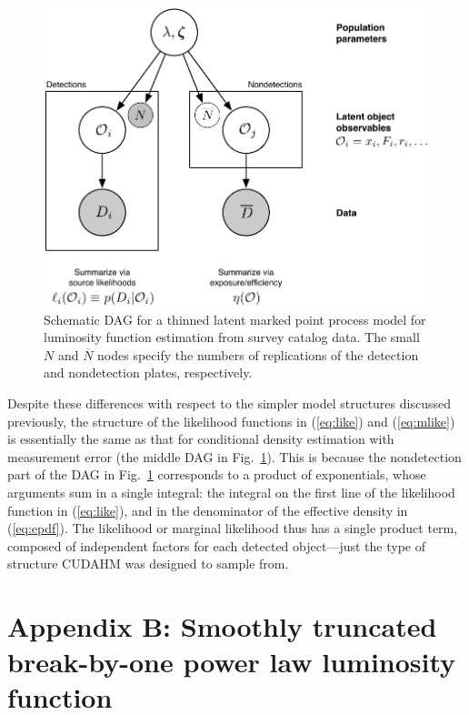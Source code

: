 \documentclass[12pt]{article}
\numberwithin{equation}{section}
\numberwithin{figure}{section}
\numberwithin{table}{section}
\begin{document}
\begin{figure}
\begin{center}
\includegraphics[width=.8\textwidth]{fig/DAG-TLPP}
\end{center}
\caption{Schematic DAG for a thinned latent marked point process model for luminosity function estimation from survey catalog data.
The small $N$ and $\overline{N}$ nodes specify the numbers of replications of the detection and nondetection plates, respectively.}
\label{fig:DAG-TLPP}
\end{figure}

Despite these differences with respect to the simpler model structures discussed previously, the structure of the likelihood functions in (\ref{eq:like}) and (\ref{eq:mlike}) is essentially the same as that for conditional density estimation with measurement error (the middle DAG in Fig.~\ref{fig:DAG-TLPP}).
This is because the nondetection part of the DAG in Fig.~\ref{fig:DAG-TLPP} corresponds to a product of exponentials, whose arguments sum in a single integral: the integral on the first line of the likelihood function in (\ref{eq:like}), and in the denominator of the effective density in (\ref{eq:epdf}).
The likelihood or marginal likelihood thus has a single product term, composed of independent factors for each detected object---just the type of structure CUDAHM was designed to sample from.



\section*{Appendix B: Smoothly truncated \\break-by-one power law luminosity function}
\renewcommand{\theequation}{B.\arabic{equation}}
\renewcommand{\thefigure}{B.\arabic{figure}}
\end{document}
